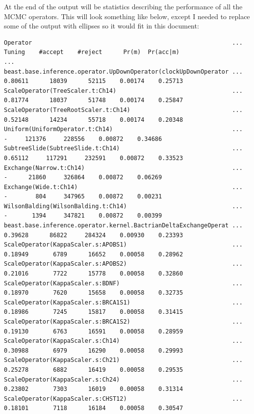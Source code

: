 \documentclass[12pt]{article}
\begin{document}
At the end of the output will be statistics describing the performance of all the MCMC operators. This will look something like below, except I needed to replace some of the output with ellipses so it would fit in this document:

\begin{verbatim}Operator                                                         ...  Tuning    #accept    #reject      Pr(m)  Pr(acc|m)
...
beast.base.inference.operator.UpDownOperator(clockUpDownOperator ... 0.80611      18039      52115    0.00174    0.25713 
ScaleOperator(TreeScaler.t:Ch14)                                 ... 0.81774      18037      51748    0.00174    0.25847 
ScaleOperator(TreeRootScaler.t:Ch14)                             ... 0.52148      14234      55718    0.00174    0.20348 
Uniform(UniformOperator.t:Ch14)                                  ...       -     121376     228556    0.00872    0.34686 
SubtreeSlide(SubtreeSlide.t:Ch14)                                ... 0.65112     117291     232591    0.00872    0.33523 
Exchange(Narrow.t:Ch14)                                          ...       -      21860     326864    0.00872    0.06269 
Exchange(Wide.t:Ch14)                                            ...       -        804     347965    0.00872    0.00231 
WilsonBalding(WilsonBalding.t:Ch14)                              ...       -       1394     347821    0.00872    0.00399 
beast.base.inference.operator.kernel.BactrianDeltaExchangeOperat ... 0.39628      86822     284324    0.00930    0.23393 
ScaleOperator(KappaScaler.s:APOBS1)                              ... 0.18949       6789      16652    0.00058    0.28962 
ScaleOperator(KappaScaler.s:APOBS2)                              ... 0.21016       7722      15778    0.00058    0.32860 
ScaleOperator(KappaScaler.s:BDNF)                                ... 0.18970       7620      15658    0.00058    0.32735 
ScaleOperator(KappaScaler.s:BRCA1S1)                             ... 0.18986       7245      15817    0.00058    0.31415 
ScaleOperator(KappaScaler.s:BRCA1S2)                             ... 0.19130       6763      16591    0.00058    0.28959 
ScaleOperator(KappaScaler.s:Ch14)                                ... 0.30988       6979      16290    0.00058    0.29993 
ScaleOperator(KappaScaler.s:Ch21)                                ... 0.25278       6882      16419    0.00058    0.29535 
ScaleOperator(KappaScaler.s:Ch24)                                ... 0.23802       7303      16019    0.00058    0.31314 
ScaleOperator(KappaScaler.s:CHST12)                              ... 0.18101       7118      16184    0.00058    0.30547 

\end{verbatim}
\end{document}
